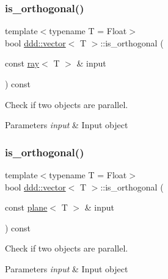 \subsubsection{\texorpdfstring{is\+\_\+orthogonal()}{is\_orthogonal()}\hspace{0.1cm}{\footnotesize\ttfamily [2/4]}}
{\footnotesize\ttfamily template$<$typename T = Float$>$ \\
bool \hyperlink{classddd_1_1vector}{ddd\+::vector}$<$ T $>$\+::is\+\_\+orthogonal (\begin{DoxyParamCaption}\item[{const \hyperlink{classddd_1_1ray}{ray}$<$ T $>$ \&}]{input }\end{DoxyParamCaption}) const\hspace{0.3cm}{\ttfamily [inline]}}



Check if two objects are parallel. 


\begin{DoxyParams}{Parameters}
{\em input} & Input object \\
\hline
\end{DoxyParams}
\mbox{\label{classddd_1_1vector_af38d308ceac7857d6ee34b585e738024}} 
\subsubsection{\texorpdfstring{is\+\_\+orthogonal()}{is\_orthogonal()}\hspace{0.1cm}{\footnotesize\ttfamily [3/4]}}
{\footnotesize\ttfamily template$<$typename T = Float$>$ \\
bool \hyperlink{classddd_1_1vector}{ddd\+::vector}$<$ T $>$\+::is\+\_\+orthogonal (\begin{DoxyParamCaption}\item[{const \hyperlink{classddd_1_1plane}{plane}$<$ T $>$ \&}]{input }\end{DoxyParamCaption}) const\hspace{0.3cm}{\ttfamily [inline]}}



Check if two objects are parallel. 


\begin{DoxyParams}{Parameters}
{\em input} & Input object \\
\hline
\end{DoxyParams}
\mbox{\label{classddd_1_1vector_aca9e60a6b4f44e5bf20400b47f4f23b7}} 
